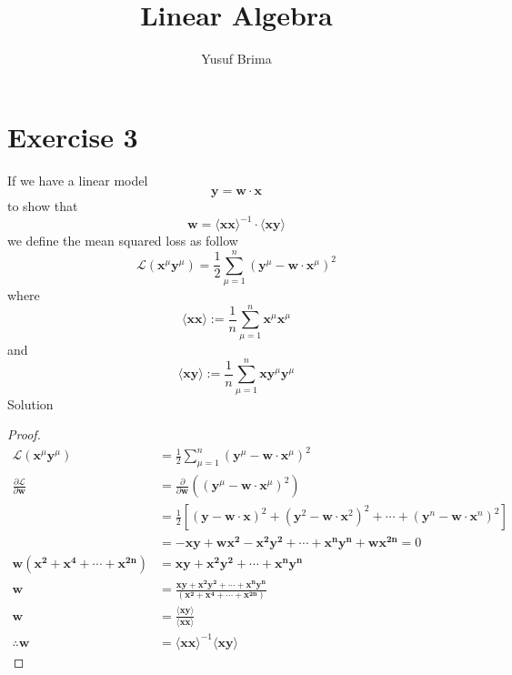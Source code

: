 \documentclass[12pt,a4paper]{article}
\author{Yusuf Brima}
\title{Linear Algebra}
\begin{document}
\section*{Exercise 3}
If  we have a linear model  
\begin{equation}
			\mathbf{y} =  \mathbf{w}  \cdot  \mathbf{x} 
\end{equation}
to show that 
\begin{equation}
    \mathbf{w}  =    \langle \mathbf{x}  \mathbf{x}   \rangle^{-1} \cdot    \langle \mathbf{x}  \mathbf{y} \rangle
\end{equation}
we define the mean squared loss as follow
\begin{equation}
	\mathcal{L}\left( \mathbf{x}^\mu  \mathbf{y}^\mu   \right) =  \frac{1}{2}  \sum_{\mu = 1}^n  \left(    \mathbf{y}^\mu   -  \mathbf{w} \cdot  \mathbf{x}^\mu   \right)^2
\end{equation}
where 
\begin{equation}
\langle \mathbf{x}  \mathbf{x}   \rangle :=  \frac{1}{n} \sum_{\mu = 1}^n  \mathbf{x}^\mu  \mathbf{x}^\mu
\end{equation}
and 
\begin{equation}
\langle \mathbf{x}  \mathbf{y}   \rangle :=  \frac{1}{n} \sum_{\mu = 1}^n  \mathbf{xy}^\mu  \mathbf{y}^\mu
\end{equation}
Solution
\begin{proof}
\begin{align*}
	\mathcal{L}\left( \mathbf{x}^\mu  \mathbf{y}^\mu   \right) &=  \frac{1}{2}  \sum_{\mu = 1}^n    \left(    \mathbf{y}^\mu   -  \mathbf{w} \cdot  \mathbf{x}^\mu   \right)^2\\
 \frac{\partial  \mathcal{L}  }{  \partial  \mathbf{w}  } &=   \frac{\partial  }{  \partial  \mathbf{w}  } \left(  \left(    \mathbf{y}^\mu   -  \mathbf{w} \cdot  \mathbf{x}^\mu   \right)^2     \right)\\
 &=  \frac{1}{2}  \left[    \left(    \mathbf{y}   -  \mathbf{w} \cdot  \mathbf{x}  \right)^2   +    \left(    \mathbf{y}^2   -  \mathbf{w} \cdot  \mathbf{x}^2  \right)^2 +  \cdots +  \left(    \mathbf{y}^n  -  \mathbf{w} \cdot  \mathbf{x}^n   \right)^2   \right]\\
 &=   -\mathbf{xy}  + \mathbf{wx^2}   -  \mathbf{x^2y^2} +  \cdots  +   \mathbf{x^ny^n}  + \mathbf{wx^{2n}} = 0\\
\mathbf{w}\left(   \mathbf{x^2}  + \mathbf{x^4}   +  \cdots  +  \mathbf{x^{2n}}  \right) &=  \mathbf{xy}  + \mathbf{x^2y^2} +  \cdots + \mathbf{x^ny^n}\\
\mathbf{w} &=  \frac{    \mathbf{xy}  + \mathbf{x^2y^2} +  \cdots + \mathbf{x^ny^n} }{ \left(   \mathbf{x^2}  + \mathbf{x^4}   +  \cdots  +  \mathbf{x^{2n}}  \right)}\\
\mathbf{w} &=  \frac{   \langle  \mathbf{xy} \rangle}{  \langle   \mathbf{xx} \rangle}\\
\therefore  \mathbf{w} &=   \langle   \mathbf{xx} \rangle^{-1}    \langle  \mathbf{xy} \rangle 
\end{align*}
\end{proof}
\end{document}
